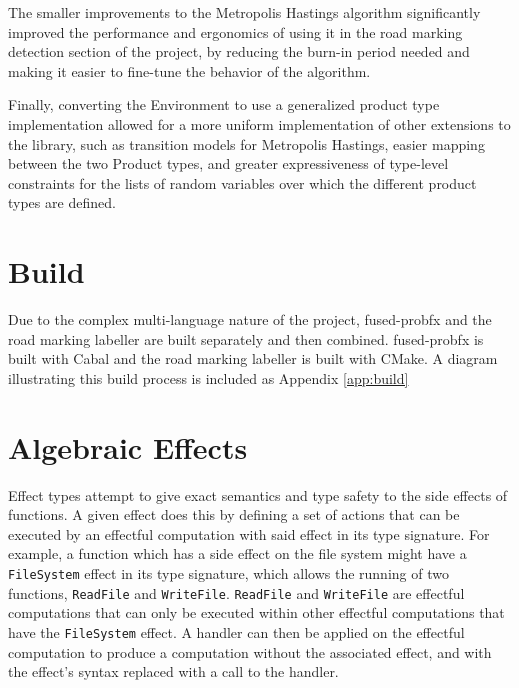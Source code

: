 \documentclass[conference]{IEEEtran}
\begin{document}
The smaller improvements to the Metropolis Hastings algorithm significantly improved the performance and ergonomics of using it in the road marking detection section of the project, by reducing the burn-in period needed and making it easier to fine-tune the behavior of the algorithm.

Finally, converting the Environment to use a generalized product type implementation allowed for a more uniform implementation of other extensions to the library, such as transition models for Metropolis Hastings, easier mapping between the two Product types, and greater expressiveness of type-level constraints for the lists of random variables over which the different product types are defined.

\section{Build}
Due to the complex multi-language nature of the project, fused-probfx and the road marking labeller are built separately and then combined. fused-probfx is built with Cabal and the road marking labeller is built with CMake. A diagram illustrating this build process is included as Appendix \ref{app:build}




\newpage
\appendices

\section{Algebraic Effects}
\label{app:AlgebraicEffectsAppendix}
Effect types attempt to give exact semantics and type safety to the side effects of functions. A given effect does this by defining a set of actions that can be executed by an effectful computation with said effect in its type signature. For example, a function which has a side effect on the file system might have a \texttt{FileSystem} effect in its type signature, which allows the running of two functions, \texttt{ReadFile} and \texttt{WriteFile}. \texttt{ReadFile} and \texttt{WriteFile} are effectful computations that can only be executed within other effectful computations that have the \texttt{FileSystem} effect. A handler can then be applied on the effectful computation to produce a computation without the associated effect, and with the effect's syntax replaced with a call to the handler. 
\end{document}
